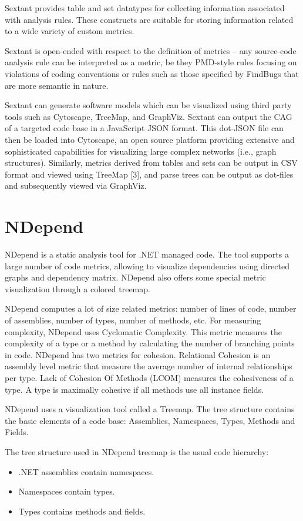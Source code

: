 Sextant provides table and set datatypes for collecting information associated with analysis rules. These constructs are suitable for storing information related to a wide variety of custom metrics.

Sextant is open-ended with respect to the definition of metrics – any source-code analysis rule can be interpreted as a metric, be they PMD-style rules focusing on violations of coding conventions or rules such as those specified by FindBugs that are more semantic in nature.

Sextant can generate software models which can be visualized using third party tools such as Cytoscape, TreeMap, and GraphViz. Sextant can output the CAG of a targeted code base in a JavaScript JSON format. This dot-JSON file can then be loaded into Cytoscape, an open source platform providing
extensive and sophisticated capabilities for visualizing large complex networks (i.e., graph structures). Similarly, metrics derived from tables and sets can be output in CSV format and viewed using TreeMap [3], and parse trees can be output as dot-files and subsequently viewed via GraphViz.

\section{NDepend}

NDepend is a static analysis tool for .NET managed code. The tool supports a large number of code metrics, allowing to visualize dependencies using directed graphs and dependency matrix. NDepend also offers some special metric visualization through a colored treemap. 

NDepend computes a lot of size related metrics: number of lines of code, number of assemblies, number of types, number of methods, etc. For measuring complexity, NDepend uses Cyclomatic Complexity. This metric measures the complexity of a type or a method by calculating the number of branching points in code.
NDepend has two metrics for cohesion. Relational Cohesion is an assembly level metric that measure the average number of internal relationships per type. Lack of Cohesion Of Methods (LCOM) measures the cohesiveness of a type. A type is maximally cohesive if all methods use all instance fields.

NDepend uses a visualization tool called a Treemap. The tree structure contains the basic elements of a code base: Assemblies, Namespaces, Types, Methods and Fields.

The tree structure used in NDepend treemap is the usual code hierarchy: 

\begin{itemize}
	\item .NET assemblies contain namespaces.
	\item Namespaces contain types.
	\item Types contains methods and fields.
\end{itemize}
